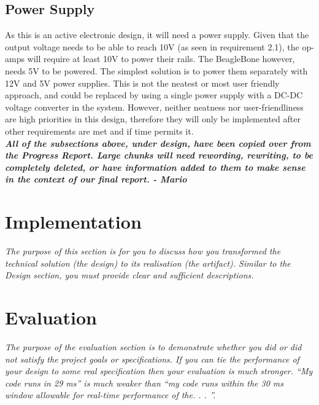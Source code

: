 \documentclass[conference]{IEEEtran}
\begin{document}
\subsection{Power Supply}

As this is an active electronic design, it will need a power supply. Given that the output voltage needs to be able to reach 10V (as seen in requirement 2.1), the op-amps will require at least 10V to power their rails. The BeagleBone however, needs 5V to be powered. The simplest solution is to power them separately with 12V and 5V power supplies. This is not the neatest or most user friendly approach, and could be replaced by using a single power supply with a DC-DC voltage converter in the system. However, neither neatness nor user-friendliness are high priorities in this design, therefore they will only be implemented after other requirements are met and if time permits it. \\

\textbf{\textit{All of the subsections above, under design, have been copied over from the Progress Report. Large chunks will need rewording, rewriting, to be completely deleted, or have information added to them to make sense in the context of our final report. - Mario}}

\section{Implementation}

\textit{The purpose of this section is for you to discuss how you transformed the technical solution (the design) to its realisation (the artifact). Similar to the Design section, you must provide clear and sufficient descriptions.} \\



\section{Evaluation}

\textit{The purpose of the evaluation section is to demonstrate whether you did or did not satisfy the project goals or specifications. If you can tie the performance of your design to some real specification then your evaluation is much stronger. “My code runs in 29 ms” is much weaker than “my code runs within the 30 ms window allowable for real-time performance of the. . . ”.} \\
\end{document}
